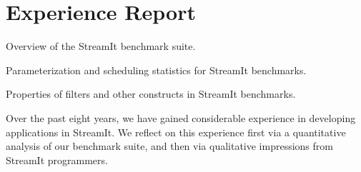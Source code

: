 
\section{Experience Report}
\label{sec:lang-experience}

\begin{table}[t!]
\vspace{-1\baselineskip}
\vspace{-1.5\baselineskip}
\caption{Overview of the StreamIt benchmark suite.\protect\label{tab:lang-benchmarks}}
\vspace{-0.5in}
\end{table}

\begin{table}[t!]
\vspace{-2\baselineskip}
\vspace{-1.5\baselineskip}
\caption{Parameterization and scheduling statistics for StreamIt 
benchmarks.\protect\label{tab:lang-benchmarks-params}}
\vspace{-0.5in}
\end{table}

\begin{table}[t!]
\vspace{-2.5\baselineskip}
\vspace{-1.5\baselineskip}
\caption{Properties of filters and other constructs in StreamIt 
benchmarks.\protect\label{tab:lang-benchmarks-filters}}
\vspace{-0.5in}
\end{table}

Over the past eight years, we have gained considerable experience in
developing applications in StreamIt.  We reflect on this experience
first via a quantitative analysis of our benchmark suite, and then via
qualitative impressions from StreamIt programmers.

